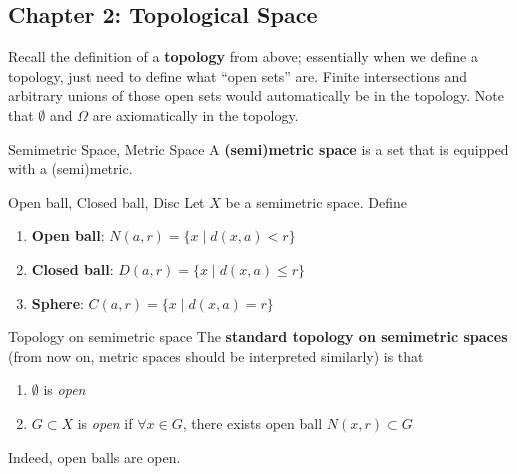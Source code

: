 \documentclass[a4paper, 10pt]{article}
\begin{document}
\subsection{Chapter 2: Topological Space}
Recall the definition of a \textbf{topology} from above; essentially when we define a topology, just need to define what ``open sets'' are. Finite intersections and arbitrary unions of those open sets would automatically be in the topology. Note that \(\emptyset\) and \( \Omega\)  are axiomatically in the topology.

\begin{definition} {Semimetric Space, Metric Space}
    A \textbf{(semi)metric space} is a set that is equipped with a (semi)metric.
\end{definition}

\begin{definition} {Open ball, Closed ball, Disc}
    Let $X$ be a semimetric space. Define \begin{enumerate}
        \item \textbf{Open ball}: $N(a, r) = \{x \mid d(x, a) < r\}$
        \item \textbf{Closed ball}: $D(a, r) = \{x \mid d(x, a) \leq r\}$
        \item \textbf{Sphere}: $C(a, r) = \{x \mid d(x, a) = r\}$
    \end{enumerate}
\end{definition}


\begin{definition} {Topology on semimetric space}
    The \textbf{standard topology on semimetric spaces} (from now on, metric spaces should be interpreted similarly) is that \begin{enumerate}
        \item $\emptyset$ is \textit{open}
        \item $G \subset X$ is \textit{open} if $\forall x \in G$, there exists open ball $N(x, r) \subset G$
    \end{enumerate}

    Indeed, open balls are open.
\end{definition}
\end{document}
